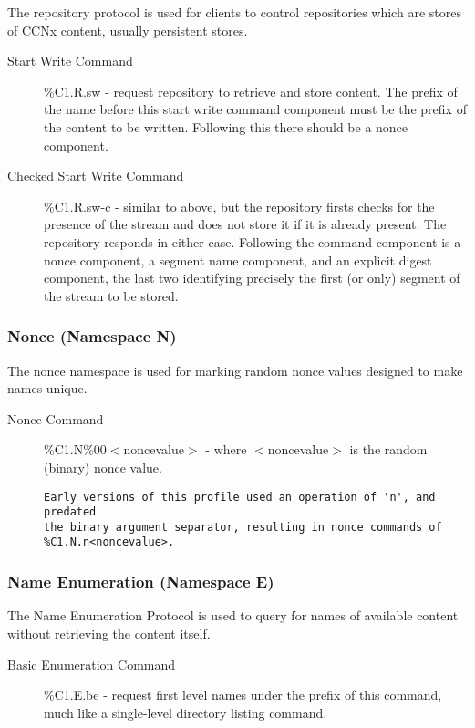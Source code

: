  The repository protocol is used for clients to control repositories which are stores of CCNx content, usually persistent stores.
\begin{description}
\item[ Start Write Command ]

 \%C1.R.sw - request repository to retrieve and store content. The prefix of the name before this start write command component must be the prefix of the content to be written. Following this there should be a nonce component. 

\item[ Checked Start Write Command ]

 \%C1.R.sw-c - similar to above, but the repository firsts checks for the presence of the stream and does not store it if it is already present. The repository responds in either case. Following the command component is a nonce component, a segment name component, and an explicit digest component, the last two identifying precisely the first (or only) segment of the stream to be stored. 


\end{description}
\subsubsection*{Nonce (Namespace N)}


 The nonce namespace is used for marking random nonce values designed to make names unique.
\begin{description}
\item[ Nonce Command ]

 \%C1.N\%00$<$noncevalue$>$ - where $<$noncevalue$>$ is the random (binary) nonce value. 
\begin{verbatim}
Early versions of this profile used an operation of 'n', and predated
the binary argument separator, resulting in nonce commands of
%C1.N.n<noncevalue>.
\end{verbatim}


\end{description}
\subsubsection*{Name Enumeration (Namespace E)}


 The Name Enumeration Protocol is used to query for names of available content without retrieving the content itself.
\begin{description}
\item[ Basic Enumeration Command ]

 \%C1.E.be - request first level names under the prefix of this command, much like a single-level directory listing command. 


\end{description}
